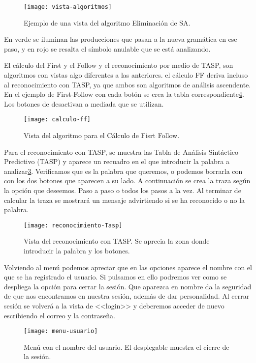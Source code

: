 \begin{figure}[h]
\centering
\texttt{[image: vista-algoritmos]}
\caption{Ejemplo de una vista del algoritmo Eliminación de SA.}
\label{fig:6.7}
\end{figure}

En verde se iluminan las producciones que pasan a la nueva gramática en ese paso, y en rojo se resalta el símbolo anulable que se está analizando.

El cálculo del First y el Follow y el reconocimiento por medio de TASP, son algoritmos con vistas algo diferentes a las anteriores. el cálculo FF deriva incluso al reconocimiento con TASP, ya que ambos son algoritmos de análisis ascendente. En el ejemplo de First-Follow con cada botón se crea la tabla correspondiente\ref{fig:6.8}. Los botones de desactivan a mediada que se utilizan.

\begin{figure}[h]
\centering
\texttt{[image: calculo-ff]}
\caption{Vista del algoritmo para el Cálculo de Fisrt Follow.}
\label{fig:6.8}
\end{figure}

Para el reconocimiento con TASP, se muestra las Tabla de Análisis Sintáctico Predictivo (TASP) y aparece un recuadro en el que introducir la palabra a analizar\ref{fig:6.9}. Verificamos que es la palabra que queremos, o podemos borrarla con con los dos botones que aparecen a su lado. A continuación se crea la traza según la opción que deseemos. Paso a paso o todos los pasos a la vez. Al terminar de calcular la traza se mostrará un mensaje advirtiendo si se ha reconocido o no la palabra.

\begin{figure}[h]
\centering
\texttt{[image: reconocimiento-Tasp]}
\caption{Vista del reconocimiento con TASP. Se aprecia la zona donde introducir la palabra y los botones.}
\label{fig:6.9}
\end{figure}

Volviendo al menú podemos apreciar que en las opciones aparece el nombre con el que se ha registrado el usuario. Si pulsamos en ello podremos ver como se despliega la opción para cerrar la sesión. Que aparezca en nombre da la seguridad de que nos encontramos en nuestra sesión, además de dar personalidad. Al cerrar sesión se volverá a la vista de <<login>> y deberemos acceder de nuevo escribiendo el correo y la contraseña.

\begin{figure}[h]
\centering
\texttt{[image: menu-usuario]}
\caption{Menú con el nombre del usuario. El desplegable muestra el cierre de la sesión.}
\label{fig:6.8}
\end{figure}

